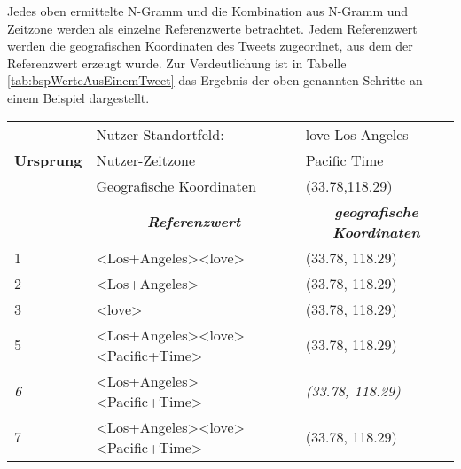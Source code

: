 			Jedes oben ermittelte N-Gramm und die Kombination aus N-Gramm und Zeitzone werden als einzelne Referenzwerte betrachtet. 
			Jedem Referenzwert werden die geografischen Koordinaten des Tweets zugeordnet, aus dem der Referenzwert erzeugt wurde.
			Zur Verdeutlichung ist in Tabelle \ref{tab:bspWerteAusEinemTweet} das Ergebnis der oben genannten Schritte an einem Beispiel dargestellt. 

				\begin{table}[h]
				\begin{tabular}{|l|l|l|}
				\hline
				\textbf{}         & Nutzer-Standortfeld:                                                                       & love Los Angeles                                                \\ \cline{2-3} 
				\textbf{Ursprung} & Nutzer-Zeitzone                                                                            & Pacific Time                                                    \\ \cline{2-3} 
				\textbf{}         & Geografische Koordinaten                                                                   & (33.78,118.29)                                                  \\ \hline
				                  & \multicolumn{1}{c|}{\textit{\textbf{Referenzwert}}}                                        & \multicolumn{1}{c|}{\textit{\textbf{geografische Koordinaten}}} \\ \hline
				1                 & \textless Los+Angeles\textgreater\textless love\textgreater                                  & (33.78, 118.29)                                                 \\ \hline
				2                 & \textless Los+Angeles\textgreater                                                           & (33.78, 118.29)                                                 \\ \hline
				3                 & \textless love\textgreater                                                                  & (33.78, 118.29)                                                 \\ \hline
				5                 & \textless Los+Angeles\textgreater\textless love\textgreater\textless Pacific+Time\textgreater & (33.78, 118.29)                                                 \\ \hline
				\textit{6}        & \textless Los+Angeles\textgreater\textless Pacific+Time\textgreater                          & \textit{(33.78, 118.29)}                                        \\ \hline
				7                 & \textless Los+Angeles\textgreater\textless love\textgreater\textless Pacific+Time\textgreater & (33.78, 118.29)                                                 \\ \hline
				\end{tabular}
				\end{table}


